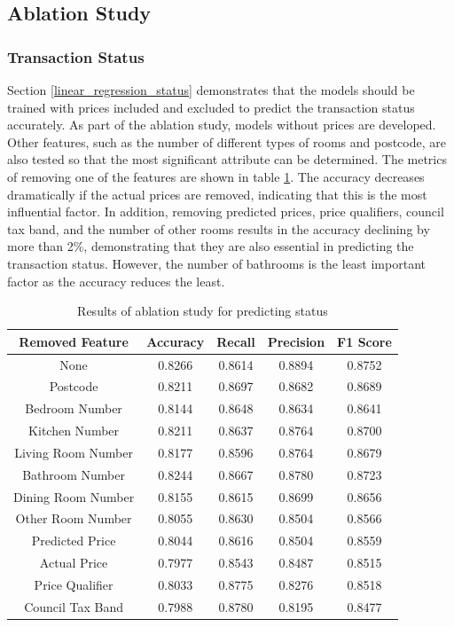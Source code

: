 \documentclass[12pt,twoside]{report}
\begin{document}
\subsection{Ablation Study}
\subsubsection{Transaction Status}
Section \ref{linear_regression_status} demonstrates that the models should be trained with prices included and excluded to predict the transaction status accurately. As part of the ablation study, models without prices are developed. Other features, such as the number of different types of rooms and postcode, are also tested so that the most significant attribute can be determined. The metrics of removing one of the features are shown in table \ref{ablation_status}. The accuracy decreases dramatically if the actual prices are removed, indicating that this is the most influential factor. In addition, removing predicted prices, price qualifiers, council tax band, and the number of other rooms results in the accuracy declining by more than 2\%, demonstrating that they are also essential in predicting the transaction status. However, the number of bathrooms is the least important factor as the accuracy reduces the least.

\begin{table}[H]
	\centering
	\caption{Results of ablation study for predicting status}
	\label{ablation_status}
	\begin{tabular}{| c | c | c | c | c | }
		\hline
		Removed Feature & Accuracy & Recall & Precision & F1 Score \\
		\hline
		None & 0.8266 & 0.8614 & 0.8894 & 0.8752 \\
		\hline
		Postcode & 0.8211 & 0.8697 & 0.8682 & 0.8689 \\
		\hline
		Bedroom Number & 0.8144 & 0.8648 & 0.8634 & 0.8641 \\
		\hline
		Kitchen Number & 0.8211 & 0.8637 & 0.8764 & 0.8700 \\
		\hline
		Living Room Number & 0.8177 & 0.8596 & 0.8764 & 0.8679 \\
		\hline
		Bathroom Number & 0.8244 & 0.8667 & 0.8780 & 0.8723 \\
		\hline
		Dining Room Number & 0.8155 & 0.8615 & 0.8699 & 0.8656 \\
		\hline
		Other Room Number & 0.8055 & 0.8630 & 0.8504 & 0.8566 \\
		\hline
		Predicted Price & 0.8044 & 0.8616 & 0.8504 & 0.8559 \\
		\hline
		Actual Price & 0.7977 & 0.8543 & 0.8487 & 0.8515 \\
		\hline
		Price Qualifier & 0.8033 & 0.8775 & 0.8276 & 0.8518 \\
		\hline
		Council Tax Band & 0.7988 & 0.8780 & 0.8195 & 0.8477 \\
		\hline
	\end{tabular}
\end{table}
\end{document}
